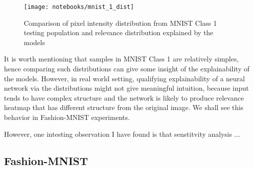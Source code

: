  \begin{figure}[h]
\centering
\texttt{[image: notebooks/mnist\_1\_dist]}
\caption{Comparison of pixel intensity distribution from MNIST Class 1 testing population and relevance distribution explained by the models} 
\label{fig:mnist_1_dist}
\end{figure}

It is worth mentioning that samples in MNIST Class 1 are relatively simples, hence comparing such distributions can give some insight of the explainability of the models. However, in real world setting, qualifying explainability of a neural network via the distributions might not give meaningful intuition, because input tends to have complex structure and the network is likely to produce relevance heatmap that has different structure from the original image. We shall see this behavior in Fashion-MNIST experiments.





However, one intesting observation I have found is that senstitvity analysis ... 
\subsection{Fashion-MNIST}


